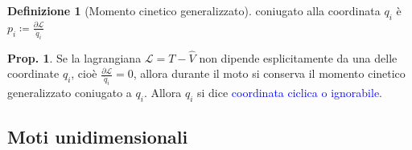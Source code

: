 \documentclass[a4paper,10pt]{article}
\theoremstyle{definition}
\theoremstyle{indentdefinition}
\newtheorem{defn}{Definizione}[section]
\theoremstyle{indenttheorem}
\newtheorem{prop}{Prop.}
\theoremstyle{myremark}
\theoremstyle{indentgeneral}
\begin{document}
\begin{defn}[Momento cinetico generalizzato]
    coniugato alla coordinata $q_i$ è $p_i\coloneqq \frac{\partial \mathcal{L}}{\dot{q}_i}$
\end{defn}

\begin{prop}
    Se la lagrangiana $\mathcal{L}=T-\hat{V}$ non dipende esplicitamente da una delle coordinate $q_i$, cioè $ \frac{\partial \mathcal{L}}{\dot{q}_i}=0$, allora durante il moto si conserva il momento cinetico generalizzato coniugato a $q_i$. Allora $q_i$ si dice \textcolor{blue}{coordinata ciclica o ignorabile}.
\end{prop}

\subsection{Moti unidimensionali}
\end{document}

